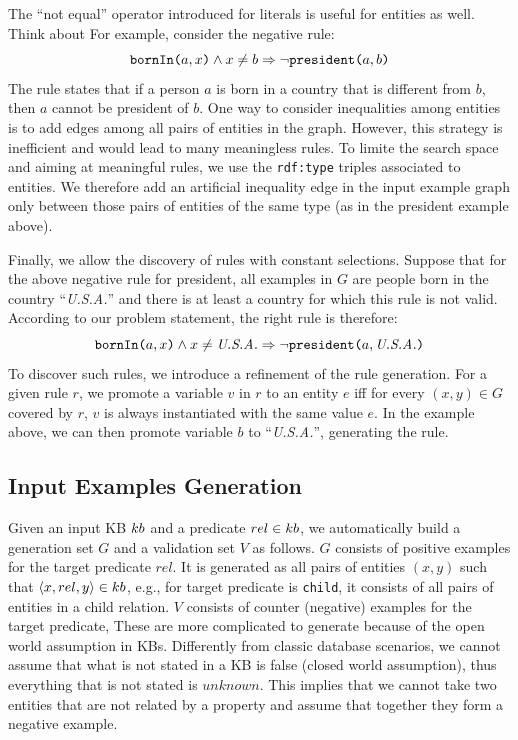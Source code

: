 \vspace{0.5ex}
The ``not equal'' operator introduced for literals is useful for entities as well. Think about 
For example, consider the negative rule:
$$ \texttt{bornIn(}a,x\texttt{)} \wedge x \neq b \Rightarrow \neg \texttt{president(}a,b\texttt{)} $$
The rule states that if a person $a$ is born in a country that is different from $b$, then $a$ cannot be president of $b$.
One way to consider inequalities among entities is to add edges among all pairs of entities in the graph. However, this strategy is inefficient and would lead to many meaningless rules. To limite the search space and aiming at meaningful rules, we use the \texttt{rdf:type} triples associated to entities. We therefore add an artificial inequality edge in the input example graph only between those pairs of entities of the same type (as in the president example above). %

\vspace{0.5ex}
Finally, we allow the discovery of rules with constant selections. %
Suppose that for the above negative rule for president, all examples in $G$ are people born in the country ``\textit{U.S.A.}'' and there is at least a country for which this rule is not valid. According to our problem statement, the right rule is therefore:
%
$$ \texttt{bornIn(}a,x\texttt{)} \wedge x \neq \emph{U.S.A.} \Rightarrow \neg \texttt{president(}a,\emph{U.S.A.}\texttt{)} $$
%
To discover such rules, we introduce a refinement of the rule generation.
For a given rule $r$, we promote a variable $v$ in $r$ to an entity $e$ iff for every $(x,y) \in G$ covered by $r$, $v$ is always instantiated with the same value $e$. In the example above, we can then promote variable $b$ to ``\textit{U.S.A.}'', generating the rule.


\subsection{Input Examples Generation} \label{sec:ex_generation}
Given an input KB ${\sc kb}$ and a predicate $rel \in {\sc kb}$, we automatically build a generation set $G$ and a validation set $V$ as follows. 
$G$ consists of positive examples for the target predicate $rel$. It is generated as all pairs of entities $(x,y)$ such that $\langle x,rel,y\rangle \in {\sc kb}$, e.g., for target predicate is \texttt{child}, it consists of all pairs of entities in a child relation.
$V$ consists of counter (negative) examples for the target predicate,
These are more complicated to generate because of the open world assumption in KBs. 
Differently from classic database scenarios, we cannot assume that what is not stated in a KB is false (closed world assumption), thus everything that is not stated is $unknown$.%
This implies that we cannot take two entities that are not related by a property and assume that together they form a negative example. 
 
